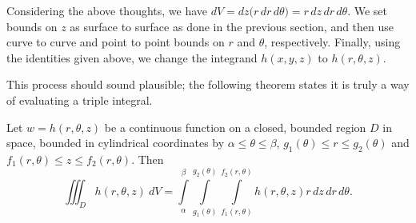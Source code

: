Considering the above thoughts, we have $dV = dz\big(r\,dr\,d\theta\big) = r\,dz\,dr\,d\theta$. We set bounds on $z$ as surface to surface as done in the previous section, and then use curve to curve and point to point bounds on $r$ and $\theta$, respectively. Finally, using the identities given above, we change the integrand $h(x,y,z)$ to $h(r,\theta,z)$.

This process should sound plausible; the following theorem states it is truly a way of evaluating a triple integral.

\begin{theorem}
\label{thm:triple_int_cylindrical}

Let $w=h(r,\theta,z)$ be a continuous function on a closed, bounded region $D$ in space, bounded in cylindrical coordinates by $\alpha \leq \theta \leq \beta$, $g_1(\theta)\leq r \leq g_2(\theta)$ and $f_1(r,\theta) \leq z \leq f_2(r,\theta)$. Then 
$$\iiint_D h(r,\theta,z)\ dV = \int\limits_\alpha^\beta\int\limits_{g_1(\theta)}^{g_2(\theta)}\int\limits_{f_1(r,\theta)}^{f_2(r,\theta)}h(r,\theta,z) r\,dz\,dr\,d\theta.$$
\end{theorem}


